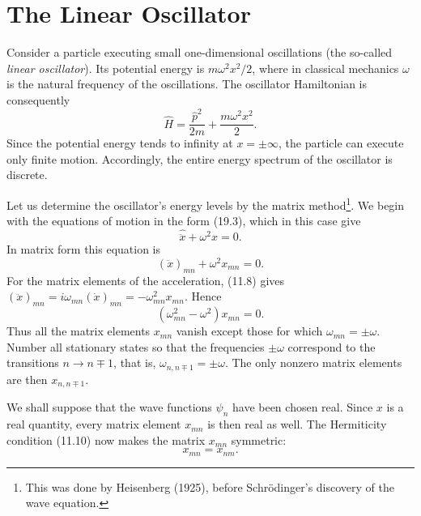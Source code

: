 \section{The Linear Oscillator}

Consider a particle executing small one-dimensional oscillations (the
so-called \emph{linear oscillator}). Its potential energy is
$m\omega^2x^2/2$, where in classical mechanics $\omega$ is the natural
frequency of the oscillations. The oscillator Hamiltonian is consequently
\begin{equation}
  \hat H=\frac{\hat p^2}{2m}+\frac{m\omega^2x^2}{2}.
  \tag{23.1}
\end{equation}
Since the potential energy tends to infinity at $x=\pm\infty$, the particle
can execute only finite motion. Accordingly, the entire energy spectrum of
the oscillator is discrete.

Let us determine the oscillator's energy levels by the matrix
method\footnote{This was done by Heisenberg (1925), before Schrödinger's
discovery of the wave equation.}. We begin with the equations of motion in the
form (19.3), which in this case give
\begin{equation}
  \hat{\ddot x}+\omega^2x=0.
  \tag{23.2}
\end{equation}
In matrix form this equation is
\[
  (\ddot x)_{mn}+\omega^2x_{mn}=0.
\]
For the matrix elements of the acceleration, (11.8) gives
$(\ddot x)_{mn}=i\omega_{mn}(\dot x)_{mn}=-\omega_{mn}^2x_{mn}$. Hence
\[
  (\omega_{mn}^2-\omega^2)x_{mn}=0.
\]
Thus all the matrix elements $x_{mn}$ vanish except those for which
$\omega_{mn}=\pm\omega$. Number all stationary states so that the frequencies
$\pm\omega$ correspond to the transitions $n\to n\mp1$, that is,
$\omega_{n,n\mp1}=\pm\omega$. The only nonzero matrix elements are then
$x_{n,n\mp1}$.

We shall suppose that the wave functions $\psi_n$ have been chosen real. Since
$x$ is a real quantity, every matrix element $x_{mn}$ is then real as well.
The Hermiticity condition (11.10) now makes the matrix $x_{mn}$ symmetric:
\[
  x_{mn}=x_{nm}.
\]

